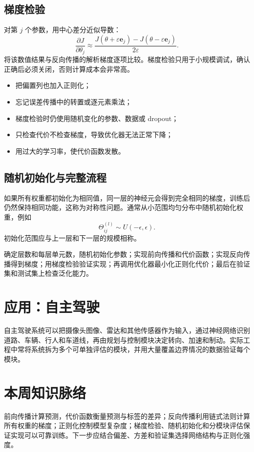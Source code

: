 \subsection{梯度检验}
\begin{tipbox}[数值梯度检查]
对第 $j$ 个参数，用中心差分近似导数：
\[
\frac{\partial J}{\partial\theta_j}\approx
\frac{J(\theta+\varepsilon\mathbf e_j)-J(\theta-\varepsilon\mathbf e_j)}{2\varepsilon}.
\]
将该数值结果与反向传播的解析梯度逐项比较。梯度检验只用于小规模调试，确认正确后必须关闭，否则计算成本会非常高。
\end{tipbox}
\begin{mistakebox}[反向传播的常见错误]
\begin{itemize}
  \item 把偏置列也加入正则化；
  \item 忘记误差传播中的转置或逐元素乘法；
  \item 梯度检验时仍使用随机变化的参数、数据或 dropout；
  \item 只检查代价不检查梯度，导致优化器无法正常下降；
  \item 用过大的学习率，使代价函数发散。
\end{itemize}
\end{mistakebox}

\subsection{随机初始化与完整流程}
\begin{keybox}[随机初始化的作用]
如果所有权重都初始化为相同值，同一层的神经元会得到完全相同的梯度，训练后仍然保持相同功能，这称为对称性问题。通常从小范围均匀分布中随机初始化权重，例如
\[
\Theta_{ij}^{(l)}\sim U(-\epsilon,\epsilon).
\]
初始化范围应与上一层和下一层的规模相称。
\end{keybox}
\begin{tipbox}[训练神经网络的工程流程]
确定层数和每层单元数，随机初始化参数；实现前向传播和代价函数；实现反向传播得到梯度；用梯度检验验证实现；再调用优化器最小化正则化代价；最后在验证集和测试集上检查泛化能力。
\end{tipbox}

\section{应用：自主驾驶}
\begin{examplebox}[从感知到控制]
自主驾驶系统可以把摄像头图像、雷达和其他传感器作为输入，通过神经网络识别道路、车辆、行人和车道线，再由规划与控制模块决定转向、加速和制动。实际工程中常将系统拆为多个可单独评估的模块，并用大量覆盖边界情况的数据验证每个模块。
\end{examplebox}
\section{本周知识脉络}
\begin{keybox}[从前向传播到反向传播]
前向传播计算预测，代价函数衡量预测与标签的差异；反向传播利用链式法则计算所有权重的梯度；正则化控制模型复杂度；梯度检验、随机初始化和分模块评估保证实现可以可靠训练。下一步应结合偏差、方差和验证集选择网络结构与正则化强度。
\end{keybox}

